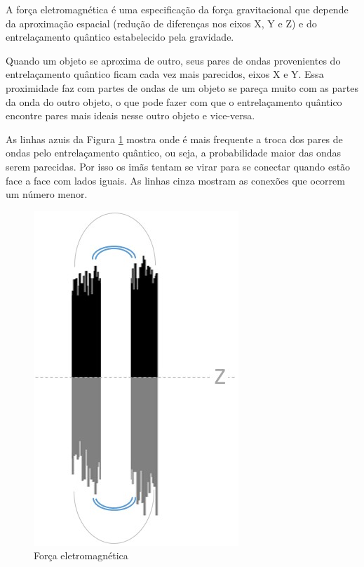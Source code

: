 A força eletromagnética é uma especificação da força gravitacional que depende da aproximação espacial (redução de diferenças nos eixos X, Y e Z) e do entrelaçamento quântico estabelecido pela gravidade.

Quando um objeto se aproxima de outro, seus pares de ondas provenientes do entrelaçamento quântico ficam cada vez mais parecidos, eixos X e Y. Essa proximidade faz com partes de ondas de um objeto se pareça muito com as partes da onda do outro objeto, o que pode fazer com que o entrelaçamento quântico encontre pares mais ideais nesse outro objeto e vice-versa.  

As linhas azuis da Figura \ref{fig:consciousness_electromaagnetic_force} mostra onde é mais frequente a troca dos pares de ondas pelo entrelaçamento quântico, ou seja, a probabilidade maior das ondas serem parecidas. Por isso os imãs tentam se virar para se conectar quando estão face a face com lados iguais. As linhas cinza mostram as conexões que ocorrem um número menor. 
\begin{figure}[H]
\caption{Força eletromagnética}
\label{fig:consciousness_electromaagnetic_force}
\centering
\includegraphics[scale=.8]{sections/images/consciousness_electromaagnetic_force.jpg}
\end{figure}

